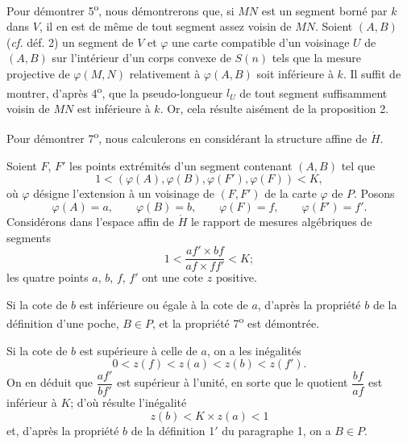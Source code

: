 \documentclass[11pt]{article}
\newcommand{\bzcf}[2]{#1}
\newenvironment{proof}[1][]{\par}{\par}
\begin{document}
\begin{proof}[Proof of \ref{bzthm:c2s2_proprietes_pseudo_longueur}]
Pour démontrer 5\textsuperscript{o}, nous démontrerons que, si $MN$ est un segment borné par $k$
dans $V$, il en est de même de tout segment assez voisin de $MN$. Soient $(A, B)$
(\bzcf{\textit{cf.} déf. 2}{\ref{bzdef:c2s2d2_segment_majore}}) un segment de $V$ et $\varphi$ une
carte compatible d'un voisinage $U$ de $(A, B)$ sur l'intérieur d'un corps convexe de $S(n)$ tels
que la mesure projective de $\varphi(M, N)$ relativement à $\varphi(A, B)$ soit inférieure à $k$.
Il suffit de montrer, d'après 4\textsuperscript{o}, que la pseudo-longueur $l_U$ de tout segment
suffisamment voisin de $MN$ est inférieure à $k$. Or, cela résulte aisément de \bzcf{la
proposition 2}{\ref{bzprop:c2s2p2_pseudo_longueur_corps_convexe}}.

Pour démontrer 7\textsuperscript{o}, nous calculerons en considérant la structure affine de
$\mathring{H}$.

Soient $F$, $F'$ les points extrémités d'un segment contenant $(A, B)$ tel que
\[ 1<(\varphi(A), \varphi(B), \varphi(F'), \varphi(F))<K, \]
où $\varphi$ désigne l'extension à un voisinage de $(F, F')$ de la carte $\varphi$ de $P$. Posons
\[ \varphi(A)=a, \qquad \varphi(B)=b, \qquad \varphi(F)=f, \qquad \varphi(F')=f'. \]
Considérons dans l'espace affin de $\mathring{H}$ le rapport de mesures algébriques de segments
\[ 1<\frac{af'\times bf}{af\times ff'}<K; \]
les quatre points $a$, $b$, $f$, $f'$ ont une cote $z$ positive.

Si la cote de $b$ est inférieure ou égale à la cote de $a$, d'après la propriété $b$ de \bzcf{la
définition d'une poche}{\ref{bzdef:c2s1d1prime_poche_projective}}, $B\in P$, et la propriété
7\textsuperscript{o} est démontrée.

Si la cote de $b$ est supérieure à celle de $a$, on a les inégalités
\[ 0<z(f)<z(a)<z(b)<z(f'). \]
On en déduit que $\dfrac{af'}{bf'}$ est supérieur à l'unité, en sorte que le quotient
$\dfrac{bf}{af}$ est inférieur à $K$; d'où résulte l'inégalité
\[ z(b)<K\times z(a)<1 \]
et, d'après la propriété $b$ de \bzcf{la définition 1$'$ du paragraphe
1}{\ref{bzdef:c2s1d1prime_poche_projective}}, on a $B\in P$.
\end{proof}
\end{document}
